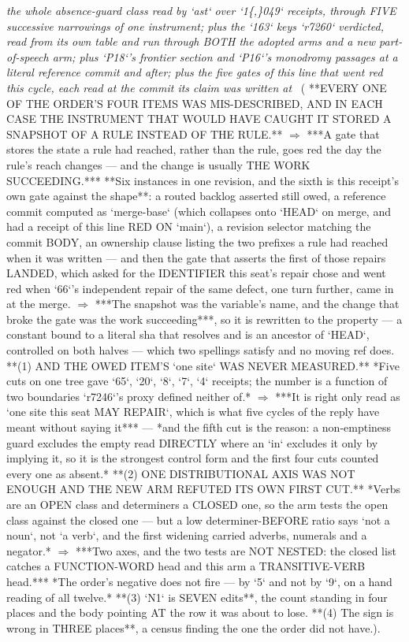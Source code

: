 \begin{description}
\textit{the whole absence-guard class read by `ast` over `1\{,\}049` receipts, through FIVE successive narrowings of one instrument; plus the `163` keys `r7260` verdicted, read from its own table and run through BOTH the adopted arms and a new part-of-speech arm; plus `P18`'s frontier section and `P16`'s monodromy passages at a literal reference commit and after; plus the five gates of this line that went red this cycle, each read at the commit its claim was written at} \ ( **EVERY ONE OF THE ORDER'S FOUR ITEMS WAS MIS-DESCRIBED, AND IN EACH CASE THE INSTRUMENT THAT WOULD HAVE CAUGHT IT STORED A SNAPSHOT OF A RULE INSTEAD OF THE RULE.** \ensuremath{\Rightarrow} ***A gate that stores the state a rule had reached, rather than the rule, goes red the day the rule's reach changes --- and the change is usually THE WORK SUCCEEDING.*** **Six instances in one revision, and the sixth is this receipt's own gate against the shape**: a routed backlog asserted still owed, a reference commit computed as `merge-base` (which collapses onto `HEAD` on merge, and had a receipt of this line RED ON `main`), a revision selector matching the commit BODY, an ownership clause listing the two prefixes a rule had reached when it was written --- and then the gate that asserts the first of those repairs LANDED, which asked for the IDENTIFIER this seat's repair chose and went red when `66`'s independent repair of the same defect, one turn further, came in at the merge. \ensuremath{\Rightarrow} ***The snapshot was the variable's name, and the change that broke the gate was the work succeeding***, so it is rewritten to the property --- a constant bound to a literal sha that resolves and is an ancestor of `HEAD`, controlled on both halves --- which two spellings satisfy and no moving ref does.  **(1) AND THE OWED ITEM'S `one site` WAS NEVER MEASURED.** *Five cuts on one tree gave `65`, `20`, `8`, `7`, `4` receipts; the number is a function of two boundaries `r7246`'s proxy defined neither of.* \ensuremath{\Rightarrow} ***It is right only read as `one site this seat MAY REPAIR`, which is what five cycles of the reply have meant without saying it*** --- *and the fifth cut is the reason: a non-emptiness guard excludes the empty read DIRECTLY where an `in` excludes it only by implying it, so it is the strongest control form and the first four cuts counted every one as absent.*  **(2) ONE DISTRIBUTIONAL AXIS WAS NOT ENOUGH AND THE NEW ARM REFUTED ITS OWN FIRST CUT.** *Verbs are an OPEN class and determiners a CLOSED one, so the arm tests the open class against the closed one --- but a low determiner-BEFORE ratio says `not a noun`, not `a verb`, and the first widening carried adverbs, numerals and a negator.* \ensuremath{\Rightarrow} ***Two axes, and the two tests are NOT NESTED: the closed list catches a FUNCTION-WORD head and this arm a TRANSITIVE-VERB head.***  *The order's negative does not fire --- by `5` and not by `9`, on a hand reading of all twelve.*  **(3) `N1` is SEVEN edits**, the count standing in four places and the body pointing AT the row it was about to lose.  **(4) The sign is wrong in THREE places**, a census finding the one the order did not have.). 

\end{description}
